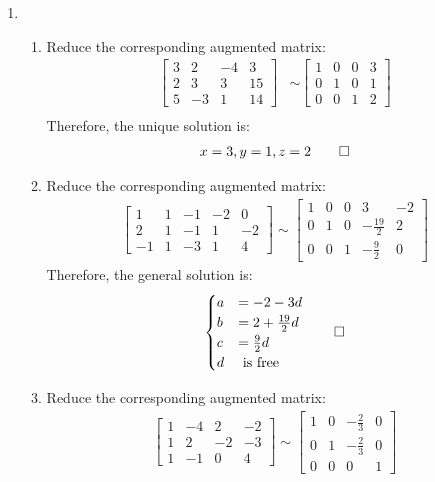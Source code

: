 \documentclass[12pt, a4paper]{article}
\begin{document}
\begin{enumerate}[Q\arabic*.]
  \item \begin{enumerate}[(\alph*)]
    \item Reduce the corresponding augmented matrix:
    \begin{align*}
      \begin{bmatrix}3 & 2 &-4 &3 \\ 2 &3 &3 &15 \\ 5 &-3 &1 &14\end{bmatrix} &\sim \begin{bmatrix}1 &0 &0 &3 \\ 0 &1 &0 &1 \\ 0 &0 &1 &2\end{bmatrix} \\
    \end{align*}
    Therefore, the unique solution is:
    \begin{align*}
      x = 3, y = 1, z = 2 \qed
    \end{align*}
    \item Reduce the corresponding augmented matrix:
    \begin{align*}
      \begin{bmatrix}1 & 1 & -1 & -2 & 0 \\ 2 & 1 & -1 & 1 & -2 \\ -1 & 1 & -3 & 1 & 4\end{bmatrix}
      \sim
      \begin{bmatrix}1 & 0 & 0 & 3 & -2 \\ 0 & 1 & 0 & -\frac{19}{2} & 2 \\ 0 & 0 &1 & -\frac{9}{2} & 0\end{bmatrix}
    \end{align*}
    Therefore, the general solution is:
    \begin{align*}
      \begin{cases}
        a &= -2 - 3d \\
        b &= 2 + \frac{19}{2}d \\
        c &= \frac{9}{2}d \\
        d & \text{ is free}
      \end{cases} \qed
    \end{align*}
    \item Reduce the corresponding augmented matrix:
    \begin{align*}
      \begin{bmatrix}1 & -4 &  2 & -2 \\ 1 &2 &-2 &-3 \\ 1 &-1 &0 &4\end{bmatrix} \sim \begin{bmatrix}1 &0 &-\frac{2}{3} &0 \\ 0 &1 &-\frac{2}{3} &0 \\ 0 &0 &0 &1\end{bmatrix} \\

\end{align*}
\end{enumerate}
\end{enumerate}
\end{document}
